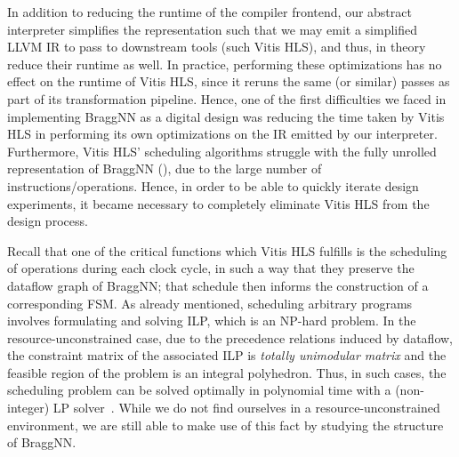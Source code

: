 In addition to reducing the runtime of the compiler frontend, our abstract interpreter simplifies the representation such that we may emit a simplified LLVM IR to pass to downstream tools (such Vitis HLS), and thus, in theory reduce their runtime as well.
In practice, performing these optimizations has no effect on the runtime of Vitis HLS, since it reruns the same (or similar) passes as part of its transformation pipeline.
Hence, one of the first difficulties we faced in implementing BraggNN as a digital design was reducing the time taken by Vitis HLS in performing its own optimizations on the IR emitted by our interpreter. 
Furthermore, Vitis HLS' scheduling algorithms struggle with the fully unrolled representation of BraggNN (), due to the large number of instructions/operations.
Hence, in order to be able to quickly iterate design experiments, it became necessary to completely eliminate Vitis HLS from the design process.

Recall that one of the critical functions which Vitis HLS fulfills is the scheduling of operations during each clock cycle, in such a way that they preserve the dataflow graph of BraggNN; that schedule then informs the construction of a corresponding FSM.
As already mentioned, scheduling arbitrary programs involves formulating and solving ILP, which is an NP-hard problem.
In the resource-unconstrained case, due to the precedence relations induced by dataflow, the constraint matrix of the associated ILP is \emph{totally unimodular matrix} and the feasible region of the problem is an integral polyhedron. 
Thus, in such cases, the scheduling problem can be solved optimally in polynomial time with a (non-integer) LP solver~\cite{tuprints9272}.
While we do not find ourselves in a resource-unconstrained environment, we are still able to make use of this fact by studying the structure of BraggNN.

